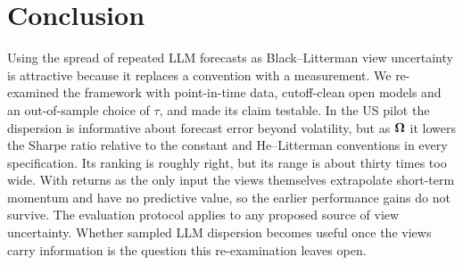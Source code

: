 \section{Conclusion}\label{sec:conclusion}

Using the spread of repeated LLM forecasts as Black--Litterman view uncertainty is attractive because it replaces a convention with a measurement. We re-examined the framework with point-in-time data, cutoff-clean open models and an out-of-sample choice of $\tau$, and made its claim testable. In the US pilot the dispersion is informative about forecast error beyond volatility, but as $\bm{\Omega}$ it lowers the Sharpe ratio relative to the constant and He--Litterman conventions in every specification. Its ranking is roughly right, but its range is about thirty times too wide. With returns as the only input the views themselves extrapolate short-term momentum and have no predictive value, so the earlier performance gains do not survive. The evaluation protocol applies to any proposed source of view uncertainty. Whether sampled LLM dispersion becomes useful once the views carry information is the question this re-examination leaves open. 
